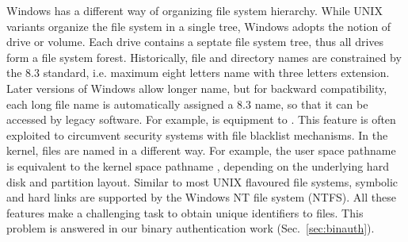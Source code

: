 Windows has a different way of organizing file system hierarchy.
While UNIX variants organize the file system in a single tree,
Windows adopts the notion of drive or volume.
Each drive contains a septate file system tree, thus all drives
form a file system forest.
Historically, file and directory names are constrained by the 8.3
standard,
i.e. maximum eight letters name with three letters extension.
Later versions of Windows allow longer name, but for backward
compatibility, each long file name is automatically assigned a
8.3 name, so that it can be accessed by legacy software.
For example,  is equipment to .
This feature is often exploited to circumvent security systems with
file blacklist mechanisms.
In the kernel, files are named in a different way.
For example, the user space pathname 
is equivalent to the kernel space pathname
,
depending on the underlying hard disk and partition layout.
Similar to most UNIX flavoured file systems, symbolic and hard links
are supported by the Windows NT file system (NTFS).
All these features make a challenging task to obtain unique identifiers to files.
This problem is answered in our binary authentication work (Sec.~\ref{sec:binauth}).


